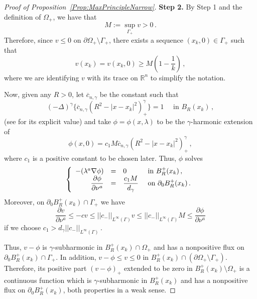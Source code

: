 \documentclass[twoside,leqno,symbols-for-thanks, draft]{rmi}
\numberwithin{equation}{section}
\theoremstyle{definition}
\newcommand{\con}[1]{\mathbb{#1}}
\newcommand{\R}{\con{R}} %
\newcommand{\norm}[1]{\left | \left |{#1} \right | \right |}
\newcommand{\s}{\gamma}
\newcommand{\fraclaplacian}{(-\Delta)^\s}
\newcommand{\bpar}[1]{\left ( {#1}\right )}
\newcommand\beqc[1]{\left\{\begin{array}{#1}}
\newcommand\eeqc{\end{array} \right.}
\def\PDEsystem{rcll}
\let\div\relax
\DeclareMathOperator{\div}{div}
\begin{document}
\begin{proof}[Proof of Proposition~\ref{Prop:MaxPrincipleNarrow}]
	\textbf{Step 2.} By Step 1 and the definition of $\Omega_+$, we have that
	\begin{equation}
	\label{Eq:PositiveSup}
	M := \sup_{\Gamma_+} v > 0\,.
	\end{equation}
	Therefore, since $v\leq 0$ on $\partial \Omega_+\setminus \Gamma_+$, there exists a sequence $(x_k,0)\in \Gamma_+$ such that
	$$
	v(x_k) = v(x_k,0) \geq M \bpar{1- \dfrac{1}{k}}\,,
	$$
	where we are identifying $v$ with its trace on $\R^n$ to simplify the notation. 
	
	Now, given any $R>0$, let $\overline{c}_{n,\s}$ be the constant such that
	$$
	\fraclaplacian \{ \overline{c}_{n,\s} (R^2 - |x-x_k|^2)^\s_+ \} = 1 \quad \text{ in } B_R (x_k)\,,
	$$
	(see \cite{BogdanEtAl} for its explicit value) and take $\phi = \phi(x,\lambda)$ to be the $\s$-harmonic extension of 
	$$
	\phi(x,0) = c_1 M  \overline{c}_{n,\s}  (R^2 - |x-x_k|^2)^\s_+\,,
	$$
	where $c_1$ is a positive constant to be chosen later. Thus, $\phi$ solves
	$$
	\beqc{\PDEsystem}
	-\div(\lambda^a \nabla \phi) &=& 0 & \text{ in } B^+_R(x_k)\,, \\
	\dfrac{\partial \phi}{\partial \nu^a} & = & \dfrac{c_1 M}{d_\s} & \text{ on } \partial_0 B^+_R(x_k)\,.
	\eeqc
	$$
	Moreover, on $\partial_0 B^+_R(x_k) \cap \Gamma_+$ we have
	$$
	\dfrac{\partial v}{\partial \nu^a} \leq - c v  \leq \norm{c_-}_{L^\infty (\Gamma)} v \leq  \norm{c_-}_{L^\infty (\Gamma)} M \leq \dfrac{\partial \phi}{\partial \nu^a}
	$$
	if we choose $c_1 > d_\s\norm{c_-}_{L^\infty (\Gamma)}$\,.
	
	Thus, $v-\phi$ is $\s$-subharmonic in $B^+_R(x_k) \cap  \Omega_+$ and has a nonpositive flux on $\partial_0 B^+_R(x_k) \cap \Gamma_+$. In addition, $v-\phi \leq v \leq 0$ in $B_R^+(x_k)\cap (\partial  \Omega_+ \setminus \Gamma_+)$. Therefore, its positive part $(v-\phi)_+$ extended to be zero in $B_R^+(x_k)\setminus  \Omega_+ $ is a continuous function which is $\s$-subharmonic in $B^+_R(x_k)$ and has a nonpositive flux on $\partial_0 B^+_R(x_k)$, both properties in a weak sense.
	

\end{proof}
\end{document}

